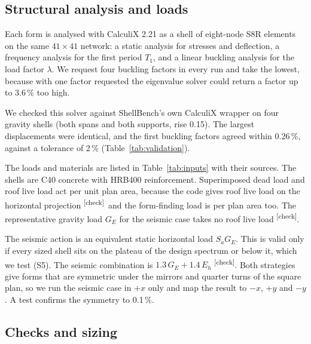 \documentclass[preprint,12pt]{elsarticle}
\newcommand{\chk}{\textsuperscript{\textcolor{markcol}{\sffamily\scriptsize[check]}}}
\newcommand{\jud}{\textsuperscript{\textcolor{markcol}{\sffamily\scriptsize[J]}}}
\newcommand{\chk}{}
\newcommand{\jud}{}
\begin{document}
\subsection{Structural analysis and loads}

Each form is analysed with CalculiX 2.21 \cite{Dhondt2004} as a shell of eight-node S8R elements on the same $41 \times 41$ network: a static analysis for stresses and deflection, a frequency analysis for the first period $T_1$, and a linear buckling analysis for the load factor $\lambda$. We request four buckling factors in every run and take the lowest, because with one factor requested the eigenvalue solver could return a factor up to 3.6\,\% too high.

We checked this solver against ShellBench's own CalculiX wrapper on four gravity shells (both spans and both supports, rise 0.15). The largest displacements were identical, and the first buckling factors agreed within 0.26\,\%, against a tolerance of 2\,\% (Table~\ref{tab:validation}).

The loads and materials are listed in Table~\ref{tab:inputs} with their sources. The shells are C40 concrete with HRB400 reinforcement. Superimposed dead load and roof live load act per unit plan area, because the code gives roof live load on the horizontal projection \cite[cl.~5.3.1]{GB50009}\chk\ and the form-finding load is per plan area too. The representative gravity load $G_E$ for the seismic case takes no roof live load \cite[Table~5.1.3]{GB50011}\chk.

The seismic action is an equivalent static horizontal load $S_a G_E$. This is valid only if every sized shell sits on the plateau of the design spectrum or below it, which we test (S5). The seismic combination is $1.3\,G_E + 1.4\,E_h$ \cite[cl.~4.3.2]{GB55002}\chk. Both strategies give forms that are symmetric under the mirrors and quarter turns of the square plan, so we run the seismic case in $+x$ only and map the result to $-x$, $+y$ and $-y$. A test confirms the symmetry to 0.1\,\%.

\begin{table}[!htbp]
\centering
\caption{Material values, loads and factors. Every value is read from ShellBench v0.3.0 at the pinned tag; none is typed into ShellForm. The source column names the ShellBench record. The superimposed dead load is the roof dead load less the 0.12~m slab it includes\jud.}
\label{tab:inputs}

\end{table}

\subsection{Checks and sizing}\label{sec:checks}
\end{document}
